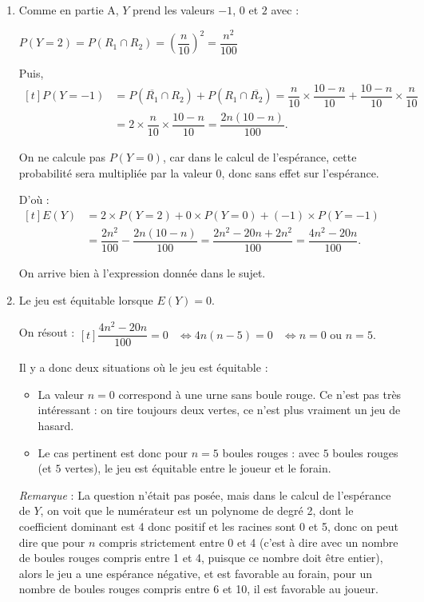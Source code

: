 	\begin{enumerate}
		\item Comme en partie A, $Y$ prend les valeurs $-1$, $0$ et $2$ avec :

		$P(Y=2)=P(R_1\cap R_2)=\left(\dfrac{n}{10}\right)^{2}=\dfrac{n^{2}}{100}$

		Puis,\quad $\begin{aligned}[t]
			P(Y=-1)&=P\left(\overline{R_1} \cap R_2\right) + P\left(R_1 \cap \overline{R_2}\right) =\dfrac{n}{10}\times\dfrac{10-n}{10} + \dfrac{10-n}{10}\times\dfrac{n}{10}\\
			&=2\times\dfrac{n}{10}\times\dfrac{10-n}{10}=\dfrac{2n(10-n)}{100}.
		\end{aligned}$

		On ne calcule pas $P(Y = 0)$, car dans le calcul de l'espérance, cette probabilité sera multipliée par la valeur 0, donc sans effet sur l'espérance.

		D'où :\quad $\begin{aligned}[t]
			E(Y)&=2\times P(Y=2)+0\times P(Y=0)+(-1)\times P(Y=-1)\\
			&=\dfrac{2n^{2}}{100}-\dfrac{2n(10-n)}{100}
			=\dfrac{2n^{2}-20n+2n^{2}}{100}
			=\dfrac{4n^{2}-20n}{100}.
		\end{aligned}$

		On arrive bien à l'expression donnée dans le sujet.

		\item Le jeu est équitable lorsque $E(Y)=0$.

		On résout :\quad $\begin{aligned}[t]
			\dfrac{4n^{2}-20n}{100}=0
			&\iff 4n(n-5)=0
			&\iff n=0 \text{ ou } n=5.
		\end{aligned}$

		Il y a donc deux situations où le jeu est équitable :
		\begin{itemize}[left=5mm,label={\textbullet~}]
			\item La valeur $n=0$ correspond à une urne sans boule rouge. Ce n'est pas très intéressant : on tire toujours deux vertes, ce n'est plus vraiment un jeu de hasard.

			\item Le cas pertinent est donc pour $n=5$ boules rouges : avec $5$ boules rouges (et $5$ vertes), le jeu est équitable entre le joueur et le forain.
		\end{itemize}

		\emph{Remarque }: La question n'était pas posée, mais dans le calcul de l'espérance de $Y$, on voit que le numérateur est un polynome de degré 2, dont le coefficient dominant est 4 donc positif et les racines sont 0 et 5, donc on peut dire que pour $n$ compris strictement entre 0 et 4 (c'est à dire avec un nombre de boules rouges compris entre 1 et 4, puisque ce nombre doit être entier), alors le jeu a une espérance négative, et est favorable au forain, pour un nombre de boules rouges compris entre 6 et 10, il est favorable au joueur.
	\end{enumerate}
